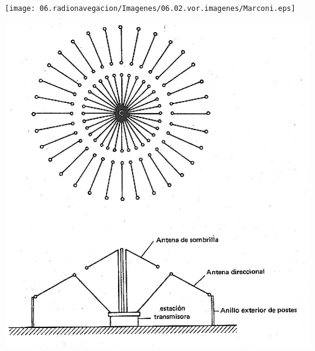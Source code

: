 \begin{minipage}[c]{0.45\linewidth}
  \begin{center}
  \texttt{[image: 06.radionavegacion/Imagenes/06.02.vor.imagenes/Marconi.eps]}
   \label{fig:Marconi}
  \vspace{3mm}
  
  \includegraphics[width=0.9\linewidth]{06.radionavegacion/Imagenes/06.02.vor.imagenes/Telefunken.eps}
   \label{fig:brujula.telefunken}
\end{center}
\end{minipage}


